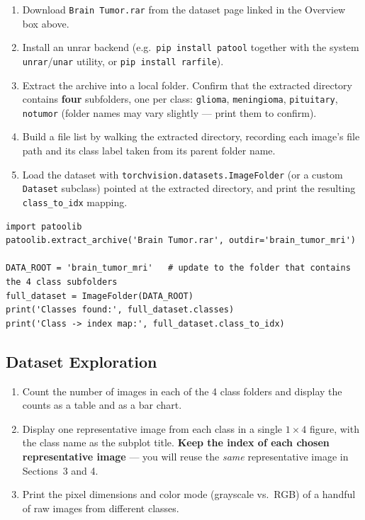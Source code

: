 \documentclass[12pt,a4paper]{article}
\begin{document}
\begin{stepbox}
\begin{enumerate}[leftmargin=*, label=\arabic*.]
  \item Download \texttt{Brain Tumor.rar} from the dataset page linked in the
        Overview box above.
  \item Install an unrar backend (e.g.\ \texttt{pip install patool} together with
        the system \texttt{unrar}/\texttt{unar} utility, or \texttt{pip install rarfile}).
  \item Extract the archive into a local folder. Confirm that the extracted directory
        contains \textbf{four} subfolders, one per class: \texttt{glioma},
        \texttt{meningioma}, \texttt{pituitary}, \texttt{notumor} (folder names may
        vary slightly --- print them to confirm).
  \item Build a file list by walking the extracted directory, recording each image's
        file path and its class label taken from its parent folder name.
  \item Load the dataset with \texttt{torchvision.datasets.ImageFolder} (or a custom
        \texttt{Dataset} subclass) pointed at the extracted directory, and print the
        resulting \texttt{class\_to\_idx} mapping.
\end{enumerate}
\end{stepbox}

\begin{lstlisting}[style=pythonstyle]
import patoolib
patoolib.extract_archive('Brain Tumor.rar', outdir='brain_tumor_mri')

DATA_ROOT = 'brain_tumor_mri'   # update to the folder that contains the 4 class subfolders
full_dataset = ImageFolder(DATA_ROOT)
print('Classes found:', full_dataset.classes)
print('Class -> index map:', full_dataset.class_to_idx)
\end{lstlisting}

\subsection{Dataset Exploration}

\begin{stepbox}
\begin{enumerate}[leftmargin=*, label=\arabic*.]
  \item Count the number of images in each of the 4 class folders and display the
        counts as a table and as a bar chart.
  \item Display one representative image from each class in a single $1 \times 4$
        figure, with the class name as the subplot title. \textbf{Keep the index of
        each chosen representative image} --- you will reuse the \emph{same}
        representative image in Sections~3 and 4.
  \item Print the pixel dimensions and color mode (grayscale vs.\ RGB) of a handful
        of raw images from different classes.
\end{enumerate}
\end{stepbox}
\end{document}

